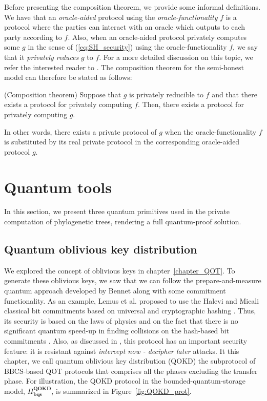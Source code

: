 Before presenting the composition theorem, we provide some informal definitions. We have that an \textit{oracle-aided} protocol using the \textit{oracle-functionality} $f$ is a protocol where the parties can interact with an oracle which outputs to each party according to $f$. Also, when an oracle-aided protocol privately computes some $g$ in the sense of (\ref{eq:SH_security}) using the oracle-functionality $f$, we say that it \textit{privately reduces} $g$ to $f$. For a more detailed discussion on this topic, we refer the interested reader to \cite{Goldreich98}. The composition theorem for the semi-honest model can therefore be stated as follows:

\begin{theorem}(Composition theorem)\label{compositionthm}
Suppose that $g$ is privately reducible to $f$ and that there exists a protocol for privately computing $f$. Then, there exists a protocol for privately computing $g$.
\end{theorem}

In other words, there exists a private protocol of $g$ when the oracle-functionality $f$ is substituted by its real private protocol in the corresponding oracle-aided protocol $g$.



\section{Quantum tools} \label{quantumTools}

In this section, we present three quantum primitives used in the private computation of phylogenetic trees, rendering a full quantum-proof solution.


\subsection{Quantum oblivious key distribution}

We explored the concept of oblivious keys in chapter~\ref{chapter_QOT}. To generate these oblivious keys, we saw that we can follow the prepare-and-measure quantum approach developed by Bennet \cite{BBCS91} along with some commitment functionality. As an example, Lemus et al. \cite{Lemus20} proposed to use the Halevi and Micali classical bit commitments based on universal and cryptographic hashing \cite{HM96}. Thus, its security is based on the laws of physics and on the fact that there is no significant quantum speed-up in finding collisions on the hash-based bit commitments \cite{Shi02, ABLST17, Lemus20}. Also, as discussed in \cite{Lemus20, Santos2021}, this protocol has an important security feature: it is resistant against \textit{intercept now - decipher later} attacks. It this chapter, we call quantum oblivious key distribution (QOKD) the subprotocol of BBCS-based QOT protocols that comprises all the phases excluding the transfer phase. For illustration, the QOKD protocol in the bounded-quantum-storage model, $\Pi^{\textbf{QOKD}}_{\textbf{bqs}}$, is summarized in Figure~\ref{fig:QOKD_prot}.


